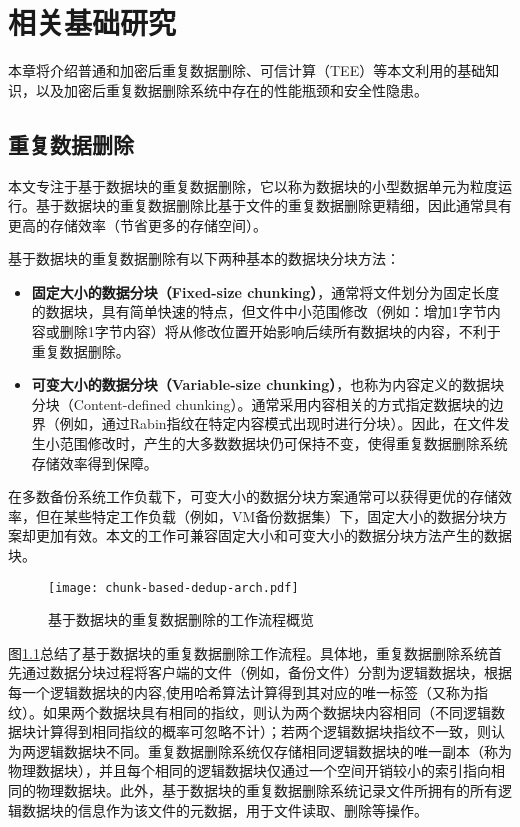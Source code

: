 \chapter{相关基础研究}
\label{chapter:background}

本章将介绍普通和加密后重复数据删除、可信计算（TEE）等本文利用的基础知识，以及加密后重复数据删除系统中存在的性能瓶颈和安全性隐患。

\section{重复数据删除}
\label{sec:background-deduplication}

本文专注于基于数据块的重复数据删除，它以称为数据块的小型数据单元为粒度运行。基于数据块的重复数据删除比基于文件的重复数据删除更精细，因此通常具有更高的存储效率（节省更多的存储空间）。

基于数据块的重复数据删除有以下两种基本的数据块分块方法：

\begin{itemize}
    \item \textbf{固定大小的数据分块（Fixed-size chunking）}，通常将文件划分为固定长度的数据块，具有简单快速的特点，但文件中小范围修改（例如：增加1字节内容或删除1字节内容）将从修改位置开始影响后续所有数据块的内容，不利于重复数据删除。
    \item \textbf{可变大小的数据分块（Variable-size chunking）}，也称为内容定义的数据块分块（Content-defined chunking）。通常采用内容相关的方式指定数据块的边界（例如，通过Rabin指纹\cite{rabin1981fingerprinting}在特定内容模式出现时进行分块）。因此，在文件发生小范围修改时，产生的大多数数据块仍可保持不变，使得重复数据删除系统存储效率得到保障。
\end{itemize}

在多数备份系统工作负载\cite{zhu2008avoiding,lillibridge2009sparse}下，可变大小的数据分块方案通常可以获得更优的存储效率，但在某些特定工作负载（例如，VM备份数据集\cite{jin2009effectiveness}）下，固定大小的数据分块方案却更加有效。本文的工作可兼容固定大小和可变大小的数据分块方法产生的数据块。

\begin{figure}[!htb]
    \small
    \centering
    \texttt{[image: chunk-based-dedup-arch.pdf]}
    \caption{基于数据块的重复数据删除的工作流程概览} 
    \label{fig:chunk-based-dedup-flow}
\end{figure}

图\ref{fig:chunk-based-dedup-flow}总结了基于数据块的重复数据删除工作流程。具体地，重复数据删除系统首先通过数据分块过程将客户端的文件（例如，备份文件）分割为逻辑数据块，根据每一个逻辑数据块的内容,使用哈希算法计算得到其对应的唯一标签（又称为指纹）。如果两个数据块具有相同的指纹，则认为两个数据块内容相同（不同逻辑数据块计算得到相同指纹的概率可忽略不计\cite{black2006compare}）；若两个逻辑数据块指纹不一致，则认为两逻辑数据块不同。重复数据删除系统仅存储相同逻辑数据块的唯一副本（称为物理数据块），并且每个相同的逻辑数据块仅通过一个空间开销较小的索引指向相同的物理数据块。此外，基于数据块的重复数据删除系统记录文件所拥有的所有逻辑数据块的信息作为该文件的元数据，用于文件读取、删除等操作。


